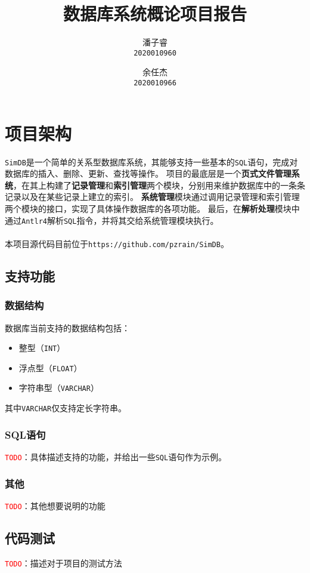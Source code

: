 \documentclass[11pt]{article}
\title{\textbf{数据库系统概论项目报告}}
\author{
    潘子睿\\
    \texttt{2020010960}
    \and
    余任杰\\
    \texttt{2020010966}
}
\begin{document}
\maketitle
\tableofcontents
\setlength{\parindent}{0pt}
\clearpage

\section{项目架构}
\texttt{SimDB}是一个简单的关系型数据库系统，其能够支持一些基本的\texttt{SQL}语句，完成对数据库的插入、删除、更新、查找等操作。
项目的最底层是一个\textbf{页式文件管理系统}，在其上构建了\textbf{记录管理}和\textbf{索引管理}两个模块，分别用来维护数据库中的一条条记录以及在某些记录上建立的索引。
\textbf{系统管理}模块通过调用记录管理和索引管理两个模块的接口，实现了具体操作数据库的各项功能。
最后，在\textbf{解析处理}模块中通过\texttt{Antlr4}解析\texttt{SQL}指令，并将其交给系统管理模块执行。\\\\
本项目源代码目前位于\texttt{https://github.com/pzrain/SimDB}。
\subsection{支持功能}
\subsubsection{数据结构}
数据库当前支持的数据结构包括：
\begin{itemize}
    \item 整型（\texttt{INT}）
    \item 浮点型（\texttt{FLOAT}）
    \item 字符串型（\texttt{VARCHAR}）
\end{itemize}
其中\texttt{VARCHAR}仅支持定长字符串。
\subsubsection{SQL语句}
\texttt{\textcolor{red}{TODO}}：具体描述支持的功能，并给出一些\texttt{SQL}语句作为示例。
\subsubsection{其他}
\texttt{\textcolor{red}{TODO}}：其他想要说明的功能
\subsection{代码测试}
\texttt{\textcolor{red}{TODO}}：描述对于项目的测试方法
\end{document}
